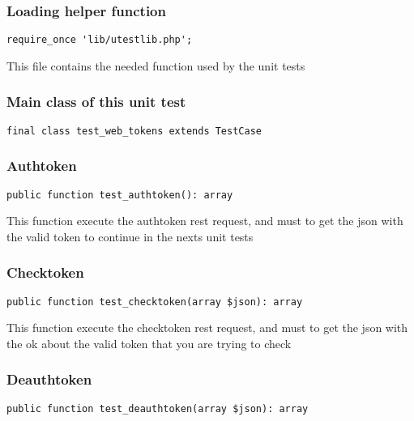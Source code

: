 \documentclass[a4paper]{article}
\begin{document}
\hypertarget{toc453}{}
\subsubsection{Loading helper function}

\begin{lstlisting}
require_once 'lib/utestlib.php';
\end{lstlisting}

This file contains the needed function used by the unit tests

\hypertarget{toc454}{}
\subsubsection{Main class of this unit test}

\begin{lstlisting}
final class test_web_tokens extends TestCase
\end{lstlisting}

\hypertarget{toc455}{}
\subsubsection{Authtoken}

\begin{lstlisting}
public function test_authtoken(): array
\end{lstlisting}

This function execute the authtoken rest request, and must to get the
json with the valid token to continue in the nexts unit tests

\hypertarget{toc456}{}
\subsubsection{Checktoken}

\begin{lstlisting}
public function test_checktoken(array $json): array
\end{lstlisting}

This function execute the checktoken rest request, and must to get the
json with the ok about the valid token that you are trying to check

\hypertarget{toc457}{}
\subsubsection{Deauthtoken}

\begin{lstlisting}
public function test_deauthtoken(array $json): array
\end{lstlisting}
\end{document}
